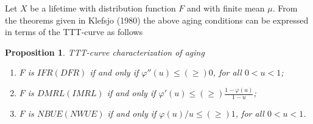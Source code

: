 \documentclass[preprint,12pt]{elsarticle}
\newtheorem{prp}{{\sc Proposition}}[section]
\begin{document}
Let $X$ be a lifetime with distribution function $F$ and with finite mean $\mu$. From the theorems given in Klefsjo (1980) the above aging conditions can be expressed in terms of the TTT-curve as follows
\begin{prp} {TTT-curve characterization of aging} \

\begin{enumerate}
\item $ F$ is $ IFR(DFR)$ if and only if $ \varphi'' (u) \leq (\geq) 0$, for all $0 <u <1$;
\item $F$ is $DMRL(IMRL)$ if and only if $ \varphi'(u) \leq (\geq) \frac{1-\varphi(u)}{1-u}$;
\item $F$ is $ NBUE(NWUE)$ if and only if $\varphi(u)/u \leq (\geq) 1$, for all $0 <u <1$.

\end{enumerate}
 \end{prp}
%
%
\end{document}
